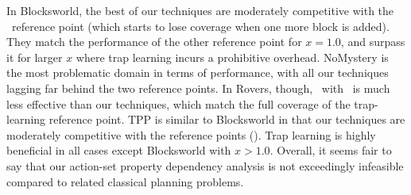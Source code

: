 In Blocksworld, the best of our techniques are moderately competitive
with the \hlmcut\ reference point (which starts to lose coverage when
one more block is added). They match the performance of the other
reference point for $x=1.0$, and surpass it for larger $x$ where trap
learning incurs a prohibitive overhead. NoMystery is the most
problematic domain in terms of performance, with all our techniques
lagging far behind the two reference points. In Rovers,
though, \astar\ with \hlmcut\ is much less effective than our
techniques, which match the full coverage of the trap-learning
reference point. TPP is similar to Blocksworld in that our techniques
are moderately competitive with the reference points (). Trap learning is highly
beneficial in all cases except Blocksworld with $x>1.0$. Overall, it
seems fair to say that our action-set property dependency analysis is
not exceedingly infeasible compared to related classical planning
problems.


\fi






































